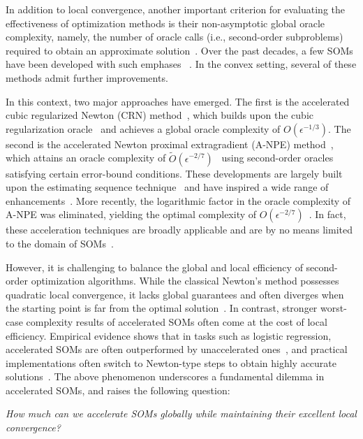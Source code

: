 \documentclass{article}
\begin{document}
In addition to local convergence, another important criterion for evaluating the effectiveness of optimization methods is their non-asymptotic global oracle complexity, namely, the number of oracle calls (i.e., second-order subproblems) required to obtain an approximate solution~\cite{cartis2022evaluation}.  Over the past decades, a few SOMs have been developed with such emphases ~\cite{nesterov2006cubic,mishchenko2023regularized,jiang2026beyond,he2025homogeneous,curtis2021trust,he2023newton,cartis2011adaptive,cartis2011adaptive_i,curtis2017trust}.
In the convex setting, several of these methods admit further improvements.

In this context, two major approaches have emerged. The first is the accelerated cubic regularized Newton (CRN) method~\cite{nesterov2008accelerating}, which builds upon the cubic regularization oracle~\cite{nesterov2006cubic} and achieves a global oracle complexity of $O(\epsilon^{-1/3})$.
The second is the accelerated Newton proximal extragradient (A-NPE) method~\cite{monteiro2013accelerated}, which attains an oracle complexity of $\tilde{O}(\epsilon^{-2/7})$~ using second-order oracles satisfying certain error-bound conditions.
These developments are largely built upon the estimating sequence technique~\cite{nesterov1983method,baes2009estimate} and have inspired a wide range of enhancements~\cite{jiang2021optimal,chen2022accelerating,lin2022explicit,agafonov2023inexact,agafonov2024advancing,jiang2024accelerated,huang2024inexact,doikov2020contracting}.
More recently, the logarithmic factor in the oracle complexity of A-NPE was eliminated, yielding the optimal complexity of $O(\epsilon^{-2/7})$~\cite{carmon2022optimal,kovalev2022first}. In fact, these acceleration techniques are broadly applicable and are by no means limited to the domain of SOMs~\cite{xu2017accelerated,xu2018accelerated,lan2012optimal,ghadimi2016accelerated}.


However, it is challenging to balance the global and local efficiency of second-order optimization algorithms. While the classical Newton's method possesses quadratic local convergence, it lacks global guarantees and often diverges when the starting point is far from the optimal solution~\cite{more1982newton,dennisjr1996numerical}. In contrast, stronger worst-case complexity results of accelerated SOMs often come at the cost of local efficiency.
Empirical evidence shows that in tasks such as logistic regression, accelerated SOMs are often outperformed by unaccelerated ones~\cite{jiang2020unified,huang2024inexact,chen2022accelerating,carmon2022optimal}, and practical implementations often switch to Newton-type steps to obtain highly accurate solutions~\cite{jiang2020unified,huang2024inexact,chen2022accelerating}. The above phenomenon underscores a fundamental dilemma in accelerated SOMs, and raises the following question:
\begin{center}
    \emph{How much can we accelerate SOMs globally while maintaining their excellent local convergence?}
\end{center}
\end{document}
